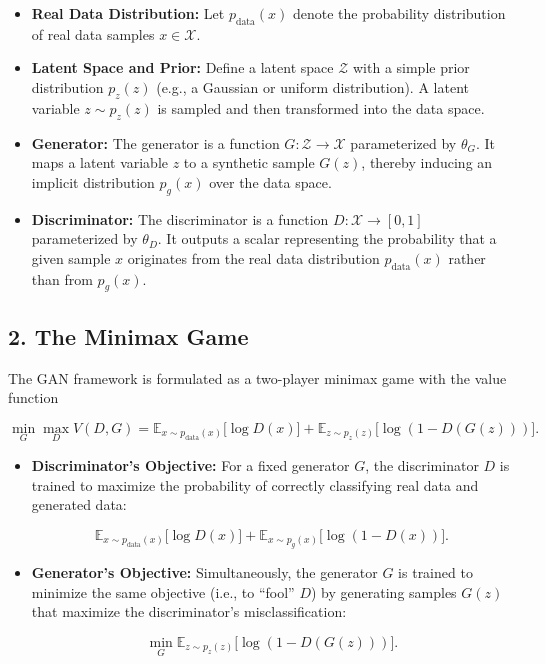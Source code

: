 \documentclass{article}
\begin{document}
\begin{itemize}
    \item \textbf{Real Data Distribution:}
    Let $ p_{\text{data}}(x) $ denote the probability distribution of real data samples $ x \in \mathcal{X} $.

    \item \textbf{Latent Space and Prior:}
    Define a latent space $ \mathcal{Z} $ with a simple prior distribution $ p_z(z) $ (e.g., a Gaussian or uniform distribution). A latent variable $ z \sim p_z(z) $ is sampled and then transformed into the data space.

    \item \textbf{Generator:}
    The generator is a function $ G: \mathcal{Z} \to \mathcal{X} $ parameterized by $ \theta_G $. It maps a latent variable $ z $ to a synthetic sample $ G(z) $, thereby inducing an implicit distribution $ p_g(x) $ over the data space.

    \item \textbf{Discriminator:}
    The discriminator is a function $ D: \mathcal{X} \to [0,1] $ parameterized by $ \theta_D $. It outputs a scalar representing the probability that a given sample $ x $ originates from the real data distribution $ p_{\text{data}}(x) $ rather than from $ p_g(x) $.
\end{itemize}

\subsection*{2. The Minimax Game}

The GAN framework is formulated as a two-player minimax game with the value function

\[
\min_{G} \max_{D} V(D,G) = \mathbb{E}_{x\sim p_{\text{data}}(x)}\big[\log D(x)\big] + \mathbb{E}_{z\sim p_z(z)}\big[\log (1 - D(G(z)))\big].
\]

\begin{itemize}
    \item \textbf{Discriminator’s Objective:}
    For a fixed generator $ G $, the discriminator $ D $ is trained to maximize the probability of correctly classifying real data and generated data:

    \[
    \mathbb{E}_{x\sim p_{\text{data}}(x)}\big[\log D(x)\big] + \mathbb{E}_{x\sim p_g(x)}\big[\log (1 - D(x))\big].
    \]

    \item \textbf{Generator’s Objective:}
    Simultaneously, the generator $ G $ is trained to minimize the same objective (i.e., to “fool” $ D $) by generating samples $ G(z) $ that maximize the discriminator's misclassification:

    \[
    \min_{G} \mathbb{E}_{z\sim p_z(z)}\big[\log (1 - D(G(z)))\big].
    \]
\end{itemize}
\end{document}
